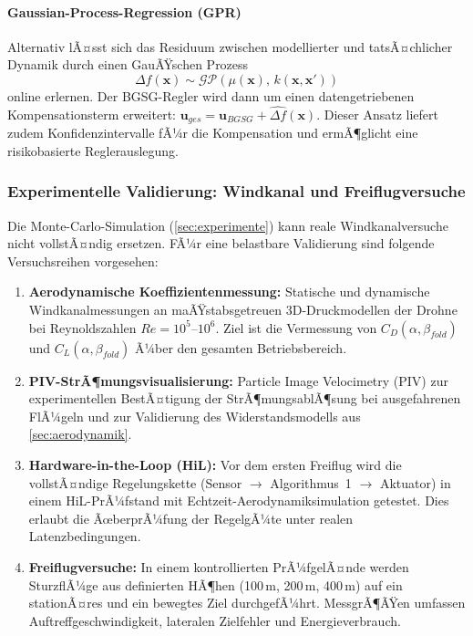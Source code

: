 ﻿\documentclass[12pt,a4paper]{article}
\theoremstyle{remark}
\begin{document}
	\paragraph{Gaussian-Process-Regression (GPR)} Alternativ lÃ¤sst sich das Residuum zwischen modellierter und tatsÃ¤chlicher Dynamik durch einen GauÃŸschen Prozess
	\begin{equation}
		\Delta f(\mathbf{x}) \sim \mathcal{GP}(\mu(\mathbf{x}),\, k(\mathbf{x}, \mathbf{x}'))
	\end{equation}
	online erlernen. Der BGSG-Regler wird dann um einen datengetriebenen Kompensationsterm erweitert: $\mathbf{u}_{ges} = \mathbf{u}_{BGSG} + \widehat{\Delta f}(\mathbf{x})$. Dieser Ansatz liefert zudem Konfidenzintervalle fÃ¼r die Kompensation und ermÃ¶glicht eine risikobasierte Reglerauslegung.

	\subsubsection{Experimentelle Validierung: Windkanal und Freiflugversuche}

	Die Monte-Carlo-Simulation (\cref{sec:experimente}) kann reale Windkanalversuche nicht vollstÃ¤ndig ersetzen. FÃ¼r eine belastbare Validierung sind folgende Versuchsreihen vorgesehen:

	\begin{enumerate}
		\item \textbf{Aerodynamische Koeffizientenmessung:} Statische und dynamische Windkanalmessungen an maÃŸstabsgetreuen \mbox{3D-Druckmodellen} der Drohne bei Reynoldszahlen $Re = 10^5$--$10^6$. Ziel ist die Vermessung von $C_D(\alpha, \beta_{fold})$ und $C_L(\alpha, \beta_{fold})$ Ã¼ber den gesamten Betriebsbereich.
		\item \textbf{PIV-StrÃ¶mungsvisualisierung:} Particle Image Velocimetry (PIV) zur experimentellen BestÃ¤tigung der StrÃ¶mungsablÃ¶sung bei ausgefahrenen FlÃ¼geln und zur Validierung des Widerstandsmodells aus \cref{sec:aerodynamik}.
		\item \textbf{Hardware-in-the-Loop (HiL):} Vor dem ersten Freiflug wird die vollstÃ¤ndige Regelungskette (Sensor $\to$ Algorithmus~1 $\to$ Aktuator) in einem HiL-PrÃ¼fstand mit Echtzeit-Aerodynamiksimulation getestet. Dies erlaubt die ÃœberprÃ¼fung der RegelgÃ¼te unter realen Latenzbedingungen.
		\item \textbf{Freiflugversuche:} In einem kontrollierten PrÃ¼fgelÃ¤nde werden SturzflÃ¼ge aus definierten HÃ¶hen (100\,m, 200\,m, 400\,m) auf ein stationÃ¤res und ein bewegtes Ziel durchgefÃ¼hrt. MessgrÃ¶ÃŸen umfassen Auftreffgeschwindigkeit, lateralen Zielfehler und Energieverbrauch.
	\end{enumerate}
\end{document}
